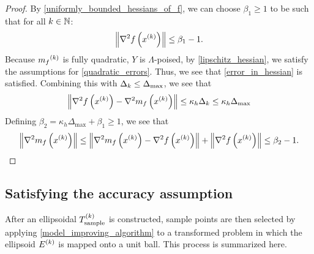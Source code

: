 \begin{proof}

By \cref{uniformly_bounded_hessians_of_f}, we can choose $\beta_1 \ge 1$ to be such that for all $k \in\mathbb N$:
\begin{align*}
\left\|\nabla^2 f\left(x^{(k)}\right) \right\| \le \beta_1 - 1.
\end{align*}
Because ${{m}_f}^{(k)}$ is fully quadratic, $Y$ is $\Lambda$-poised, by \cref{lipschitz_hessian}, we satisfy the assumptions for \cref{quadratic_errors}.
Thus, we see that \cref{error_in_hessian} is satisfied.
Combining this with $\Delta_k \le {\Delta_{\textrm{max}}}$, we see that
\begin{align*}
\left\|\nabla^2 f\left(x^{(k)}\right) - \nabla^2 m_f\left(x^{(k)}\right) \right\| \le \kappa_{h} \Delta_k \le \kappa_{h} \Delta_{\text{max}}
\end{align*}
Defining $\beta_2 = \kappa_{h} \Delta_{\text{max}} + \beta_1 \ge 1$, we see that
\begin{align*}
\left\|\nabla^2 m_{f}\left(x^{(k)}\right)\right\| \le \left\|\nabla^2 m_{f}\left(x^{(k)}\right) - \nabla^2 f\left(x^{(k)}\right)  \right\| + \left\|\nabla^2 f\left(x^{(k)}\right) \right\|
\le \beta_2 - 1 .
\end{align*}
\end{proof}



\subsection{Satisfying the accuracy assumption}
\label{satisfying_accuracy}

After an ellipsoidal ${T_{\text{sample}}^{(k)}}$ is constructed,  sample points are then selected by applying  \cref{model_improving_algorithm} 
to a transformed problem in which the ellipsoid ${E^{(k)}}$ is mapped onto a unit ball.
This process is summarized here.

